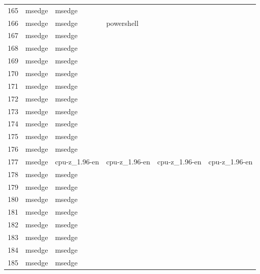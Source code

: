 \documentclass[a4paper,twoside,12pt]{book}
\begin{document}
\begin{appendices}
\begin{table}
\begin{tabular}{llllll}
		165 &  msedge &         msedge &                &                &                \\
		166 &  msedge &         msedge &     powershell &                &                \\
		167 &  msedge &         msedge &                &                &                \\
		168 &  msedge &         msedge &                &                &                \\
		169 &  msedge &         msedge &                &                &                \\
		170 &  msedge &         msedge &                &                &                \\
		171 &  msedge &         msedge &                &                &                \\
		172 &  msedge &         msedge &                &                &                \\
		173 &  msedge &         msedge &                &                &                \\
		174 &  msedge &         msedge &                &                &                \\
		175 &  msedge &         msedge &                &                &                \\
		176 &  msedge &         msedge &                &                &                \\
		177 &  msedge &  cpu-z\_1.96-en &  cpu-z\_1.96-en &  cpu-z\_1.96-en &  cpu-z\_1.96-en \\
		178 &  msedge &         msedge &                &                &                \\
		179 &  msedge &         msedge &                &                &                \\
		180 &  msedge &         msedge &                &                &                \\
		181 &  msedge &         msedge &                &                &                \\
		182 &  msedge &         msedge &                &                &                \\
		183 &  msedge &         msedge &                &                &                \\
		184 &  msedge &         msedge &                &                &                \\
		185 &  msedge &         msedge &                &                &                \\

\end{tabular}
\end{table}
\end{appendices}
\end{document}
